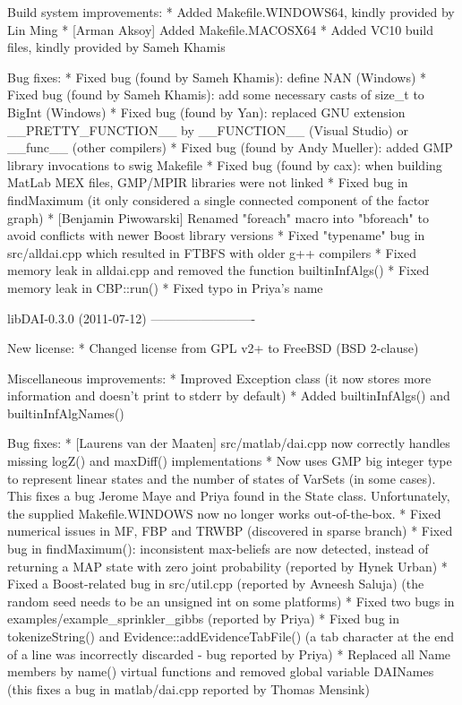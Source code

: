 \begin{DoxyVerbInclude}
Build system improvements:
* Added Makefile.WINDOWS64, kindly provided by Lin Ming
* [Arman Aksoy] Added Makefile.MACOSX64
* Added VC10 build files, kindly provided by Sameh Khamis

Bug fixes:
* Fixed bug (found by Sameh Khamis): define NAN (Windows)
* Fixed bug (found by Sameh Khamis): add some necessary casts of size_t to BigInt (Windows)
* Fixed bug (found by Yan): replaced GNU extension __PRETTY_FUNCTION__ by __FUNCTION__ (Visual Studio) or __func__ (other compilers)
* Fixed bug (found by Andy Mueller): added GMP library invocations to swig Makefile
* Fixed bug (found by cax): when building MatLab MEX files, GMP/MPIR libraries were not linked
* Fixed bug in findMaximum (it only considered a single connected component of the factor graph)
* [Benjamin Piwowarski] Renamed "foreach" macro into "bforeach" to avoid conflicts with newer Boost library versions
* Fixed "typename" bug in src/alldai.cpp which resulted in FTBFS with older g++ compilers
* Fixed memory leak in alldai.cpp and removed the function builtinInfAlgs()
* Fixed memory leak in CBP::run()
* Fixed typo in Priya's name


libDAI-0.3.0 (2011-07-12)
-------------------------

New license:
* Changed license from GPL v2+ to FreeBSD (BSD 2-clause)

Miscellaneous improvements:
* Improved Exception class 
  (it now stores more information and doesn't print to stderr by default)
* Added builtinInfAlgs() and builtinInfAlgNames()

Bug fixes:
* [Laurens van der Maaten] src/matlab/dai.cpp now correctly handles missing logZ() 
  and maxDiff() implementations
* Now uses GMP big integer type to represent linear states and the number of
  states of VarSets (in some cases). This fixes a bug Jerome Maye and Priya 
  found in the State class. Unfortunately, the supplied Makefile.WINDOWS now 
  no longer works out-of-the-box.
* Fixed numerical issues in MF, FBP and TRWBP (discovered in sparse branch)
* Fixed bug in findMaximum(): inconsistent max-beliefs are now detected,
  instead of returning a MAP state with zero joint probability
  (reported by Hynek Urban)
* Fixed a Boost-related bug in src/util.cpp (reported by Avneesh Saluja)
  (the random seed needs to be an unsigned int on some platforms)
* Fixed two bugs in examples/example_sprinkler_gibbs (reported by Priya)
* Fixed bug in tokenizeString() and Evidence::addEvidenceTabFile()
  (a tab character at the end of a line was incorrectly discarded - bug reported by Priya)
* Replaced all Name members by name() virtual functions and removed global variable DAINames
  (this fixes a bug in matlab/dai.cpp reported by Thomas Mensink)



\end{DoxyVerbInclude}
